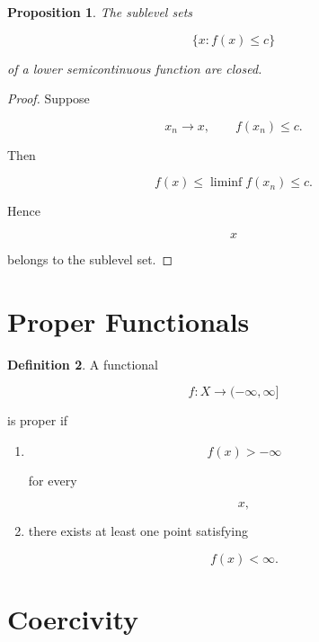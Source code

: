 \documentclass[11pt]{book}
\numberwithin{equation}{chapter}
\theoremstyle{definition}
\newtheorem{definition}{Definition}[chapter]
\theoremstyle{plain}
\newtheorem{proposition}[definition]{Proposition}
\begin{document}

\begin{proposition}

The sublevel sets

\[
\{x:f(x)\le c\}
\]

of a lower semicontinuous function are closed.

\end{proposition}

\begin{proof}

Suppose

\[
x_n\rightarrow x,
\qquad
f(x_n)\le c.
\]

Then

\[
f(x)
\le
\liminf f(x_n)
\le c.
\]

Hence

\[
x
\]

belongs to the sublevel set.

\end{proof}


\section{Proper Functionals}

\begin{definition}

A functional

\[
f:X\rightarrow(-\infty,\infty]
\]

is proper if

\begin{enumerate}

\item
\[
f(x)>-\infty
\]

for every

\[
x,
\]

\item

there exists at least one point satisfying

\[
f(x)<\infty.
\]

\end{enumerate}

\end{definition}


\section{Coercivity}
\end{document}

